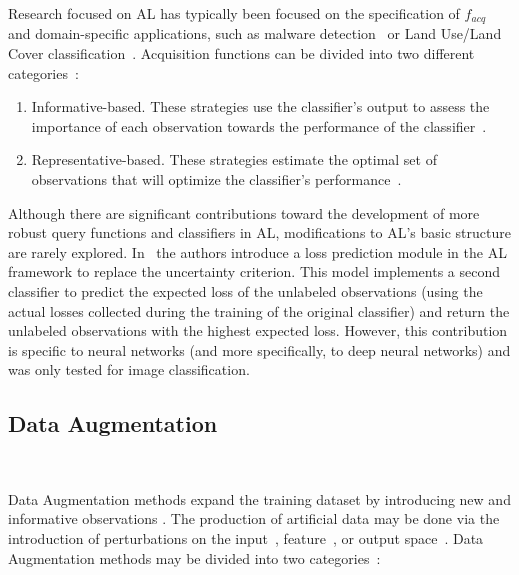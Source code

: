 \documentclass[10pt,journal,compsoc]{IEEEtran}
\begin{document}
Research focused on AL has typically been focused on the specification of
$f_{acq}$~\cite{hospedales2011finding} and domain-specific applications, such
as malware detection~\cite{li2022boosting} or Land Use/Land Cover
classification~\cite{li2020label}. Acquisition functions can be divided into
two different categories~\cite{su2021cost, Kumar2020}: 

\begin{enumerate}

    \item Informative-based. These strategies use the classifier's output to
        assess the importance of each observation towards the performance of
        the classifier~\cite{Fu2013}.

    \item Representative-based. These strategies estimate the optimal set of
        observations that will optimize the classifier's
        performance~\cite{Kumar2020}.

\end{enumerate}

Although there are significant contributions toward the development of more
robust query functions and classifiers in AL, modifications to AL's basic
structure are rarely explored. In~\cite{Yoo2019} the authors introduce a loss
prediction module in the AL framework to replace the uncertainty criterion.
This model implements a second classifier to predict the expected loss of the
unlabeled observations (using the actual losses collected during the training
of the original classifier) and return the unlabeled observations with the
highest expected loss. However, this contribution is specific to neural
networks (and more specifically, to deep neural networks) and was only tested
for image classification.

\subsection{Data Augmentation}~\label{sec:data_augmentation}

Data Augmentation methods expand the training dataset by introducing new and
informative observations \cite{Behpour2019}. The production of artificial data
may be done via the introduction of perturbations on the
input~\cite{fonseca2021improving}, feature~\cite{DeVries2017}, or output
space~\cite{Behpour2019}. Data Augmentation methods may be divided into two
categories~\cite{Shorten2019}:
\end{document}
